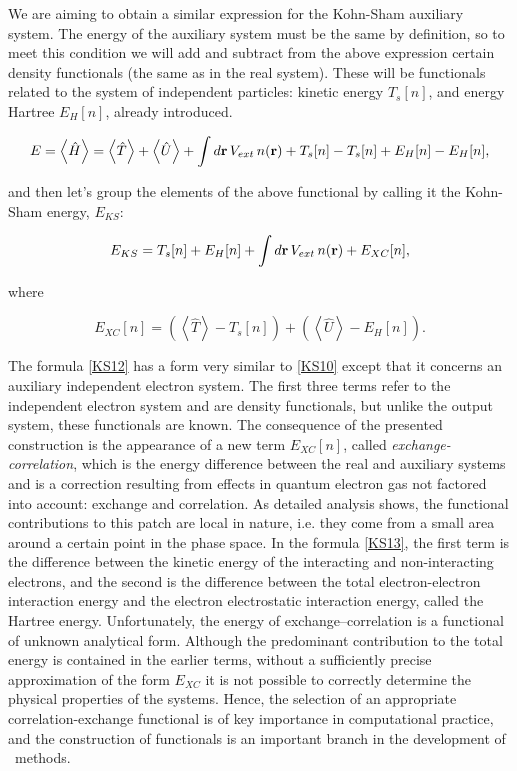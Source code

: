 We are aiming to obtain a similar expression for the Kohn-Sham auxiliary system.
The energy of the auxiliary system must be the same by definition, so to meet this condition we will add and subtract from the above expression certain density functionals (the same as in the real system).
These will be functionals related to the system of independent particles: kinetic energy $T_s[n]$, and energy Hartree $E_H[n]$, already introduced.

\begin{equation}
    \label{KS11}
    E=\left<\hat{H}\right>=\left<\hat{T}\right>+\left<\hat{U}\right>+\int d\mathbf{r}\,V_{ext}\,n(\mathbf{r})+T_s[n]-T_s[n]+E_H[n]-E_H[n],
\end{equation}

and then let's group the elements of the above functional by calling it the Kohn-Sham energy, $E_{KS}$:

\begin{equation}
    \label{KS12}
    E_{KS}=T_s[n]+E_H[n]+\int d\mathbf{r}\,V_{ext}\,n(\mathbf{r})+E_{XC}[n],
\end{equation}

where

\begin{equation}
    \label{KS13}
    E_{XC}[n]=\left(\left<\hat{T}\right>-T_s[n]\right)+\left(\left<\hat{U}\right>-E_H[n]\right).
\end{equation}

The formula \ref{KS12} has a form very similar to \ref{KS10} except that it concerns an auxiliary independent electron system.
The first three terms refer to the independent electron system and are density functionals, but unlike the output system, these functionals are known.
The consequence of the presented construction is the appearance of a new term $E_{XC}[n]$, called \emph{exchange-correlation}, which is the energy difference between the real and auxiliary systems and is a correction resulting from effects in quantum electron gas not factored into account: exchange and correlation.
As detailed analysis shows, the functional contributions to this patch are local in nature, i.e. they come from a small area around a certain point in the phase space.
In the formula \ref{KS13}, the first term is the difference between the kinetic energy of the interacting and non-interacting electrons, and the second is the difference between the total electron-electron interaction energy and the electron electrostatic interaction energy, called the Hartree energy.
Unfortunately, the energy of exchange--correlation is a functional of unknown analytical form.
Although the predominant contribution to the total energy is contained in the earlier terms, without a sufficiently precise approximation of the form $E_{XC}$ it is not possible to correctly determine the physical properties of the systems.
Hence, the selection of an appropriate correlation-exchange functional is of key importance in computational practice, and the construction of functionals is an important branch in the development of \DFT\ methods.

